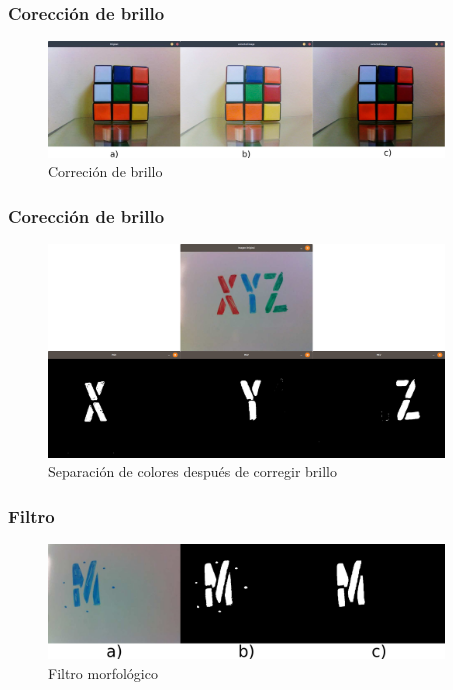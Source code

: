 \documentclass[11pt]{beamer}
\begin{document}
  \begin{frame}
    \frametitle{Corección de brillo}
    \begin{figure}[h]
      \includegraphics[width=10.5cm, keepaspectratio]{images/gamma.png}
      \caption{Correción de brillo}
    \end{figure}
  \end{frame}
  \begin{frame}
    \frametitle{Corección de brillo}
    \begin{figure}[h]
      \includegraphics[width=10.5cm, keepaspectratio]{images/separacion-colores.png}
      \caption{Separación de colores después de corregir brillo}
    \end{figure}
  \end{frame}
  \begin{frame}
    \frametitle{Filtro}
    \begin{figure}[h]
      \includegraphics[width=10.5cm, keepaspectratio]{images/filtro.png}
      \caption{Filtro morfológico}
    \end{figure}
  \end{frame}
\end{document}
